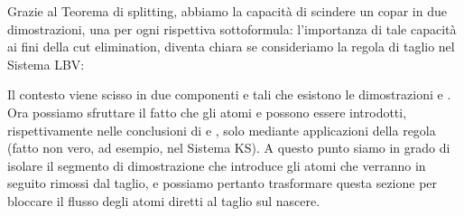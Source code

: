 \documentclass[12pt,a4paper,openright,twoside]{report}
\begin{document}
Grazie al Teorema di splitting, abbiamo la capacit\`a di scindere un copar in due dimostrazioni, una per ogni rispettiva sottoformula: l'importanza di tale capacit\`a ai fini della cut elimination, diventa chiara se consideriamo la regola di taglio nel Sistema \textsf{LBV}:

Il contesto  viene scisso in due componenti  e  tali che esistono le dimostrazioni  e . Ora possiamo sfruttare il fatto che gli atomi  e  possono essere introdotti, rispettivamente nelle conclusioni di  e , solo mediante applicazioni della regola  (fatto non vero, ad esempio, nel Sistema \textsf{KS}). A questo punto siamo in grado di isolare il segmento di dimostrazione che introduce gli atomi che verranno in seguito rimossi dal taglio, e possiamo pertanto trasformare questa sezione per bloccare il flusso degli atomi diretti al taglio sul nascere.
\end{document}

